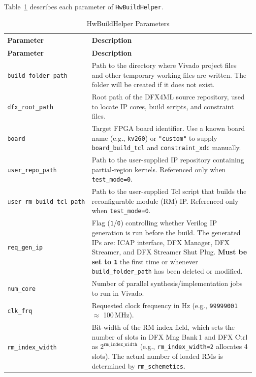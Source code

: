 \documentclass{cernatsnote}
\begin{document}
Table~\ref{tab:hw_build_params} describes each parameter of \texttt{HwBuildHelper}.

\renewcommand{\arraystretch}{1.3}
\begin{longtable}{|l|p{11cm}|}
\caption{HwBuildHelper Parameters}
\label{tab:hw_build_params} \\
\hline
\textbf{Parameter} & \textbf{Description} \\
\hline
\endfirsthead
\hline
\textbf{Parameter} & \textbf{Description} \\
\hline
\endhead
\hline
\endfoot
\texttt{build\_folder\_path} & Path to the directory where Vivado project files and other temporary working files are written. The folder will be created if it does not exist. \\
\hline
\texttt{dfx\_root\_path} & Root path of the DFX4ML source repository, used to locate IP cores, build scripts, and constraint files. \\
\hline
\texttt{board} & Target FPGA board identifier. Use a known board name (e.g., \texttt{kv260}) or \texttt{"custom"} to supply \texttt{board\_build\_tcl} and \texttt{constraint\_xdc} manually. \\
\hline
\texttt{user\_repo\_path} & Path to the user-supplied IP repository containing partial-region kernels. Referenced only when \texttt{test\_mode=0}. \\
\hline
\texttt{user\_rm\_build\_tcl\_path} & Path to the user-supplied Tcl script that builds the reconfigurable module (RM) IP. Referenced only when \texttt{test\_mode=0}. \\
\hline
\texttt{req\_gen\_ip} & Flag (\texttt{1}/\texttt{0}) controlling whether Verilog IP generation is run before the build. The generated IPs are: ICAP interface, DFX Manager, DFX Streamer, and DFX Streamer Shut Plug. \textbf{Must be set to \texttt{1}} the first time or whenever \texttt{build\_folder\_path} has been deleted or modified. \\
\hline
\texttt{num\_core} & Number of parallel synthesis/implementation jobs to run in Vivado. \\
\hline
\texttt{clk\_frq} & Requested clock frequency in Hz (e.g., \texttt{99999001} $\approx$ 100\,MHz). \\
\hline
\texttt{rm\_index\_width} & Bit-width of the RM index field, which sets the number of slots in DFX Mng Bank\,1 and DFX Ctrl as $2^{\texttt{rm\_index\_width}}$ (e.g., \texttt{rm\_index\_width=2} allocates 4 slots). The actual number of loaded RMs is determined by \texttt{rm\_schemetics}. \\

\end{longtable}
\end{document}
